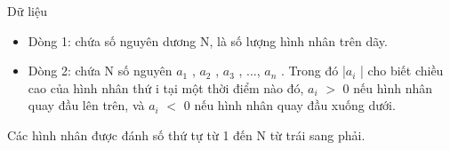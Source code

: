 Dữ liệu  
\begin{itemize}
	\item     Dòng 1: chứa số nguyên dương N, là số lượng hình nhân trên dãy.   
	\item     Dòng 2: chứa N số nguyên $a_{1}$    , $a_{2}$    , $a_{3}$    , ..., $a_{n}$    . Trong đó |$a_{i}$    | cho biết chiều cao của hình nhân thứ i tại một thời điểm nào đó, $a_{i}$    $>$ 0 nếu hình nhân quay đầu lên trên, và $a_{i}$    $<$ 0 nếu hình nhân quay đầu xuống dưới.   
\end{itemize}

   Các hình nhân được đánh số thứ tự từ 1 đến N từ trái sang phải.